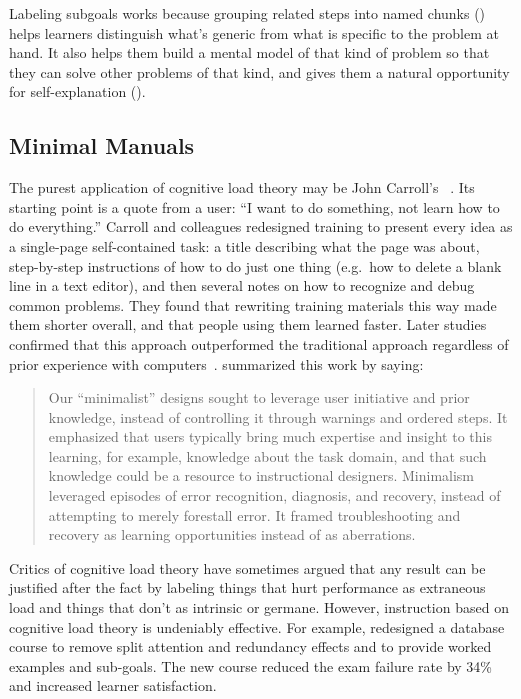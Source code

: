 Labeling subgoals works because grouping related steps into named chunks ()
helps learners distinguish what's generic from what is specific to the problem at hand.
It also helps them build a mental model of that kind of problem
so that they can solve other problems of that kind,
and gives them a natural opportunity for self-explanation ().

\subsection*{Minimal Manuals}

The purest application of cognitive load theory may be John Carroll's
~\cite{Carr1987,Carr2014}.
Its starting point is a quote from a user:
``I want to do something, not learn how to do everything.''
Carroll and colleagues redesigned training to present every idea as a single-page self-contained task:
a title describing what the page was about,
step-by-step instructions of how to do just one thing
(e.g.\ how to delete a blank line in a text editor),
and then several notes on how to recognize and debug common problems.
They found that rewriting training materials this way made them shorter overall,
and that people using them learned faster.
Later studies confirmed that this approach outperformed the traditional approach
regardless of prior experience with computers~\cite{Lazo1993}.
\cite{Carr2014} summarized this work by saying:

\begin{quote}

  Our ``minimalist'' designs sought to leverage user initiative and prior knowledge,
  instead of controlling it through warnings and ordered steps.
  It emphasized that users typically bring much expertise and insight to this learning,
  for example,
  knowledge about the task domain,
  and that such knowledge could be a resource to instructional designers.
  Minimalism leveraged episodes of error recognition, diagnosis, and recovery,
  instead of attempting to merely forestall error.
  It framed troubleshooting and recovery as learning opportunities instead of as aberrations.

\end{quote}


Critics of cognitive load theory have sometimes argued that
any result can be justified after the fact by labeling things that hurt performance as extraneous load
and things that don't as intrinsic or germane.
However,
instruction based on cognitive load theory is undeniably effective.
For example,
\cite{Maso2016} redesigned a database course to remove split attention and redundancy effects
and to provide worked examples and sub-goals.
The new course reduced the exam failure rate by 34\%
and increased learner satisfaction.

